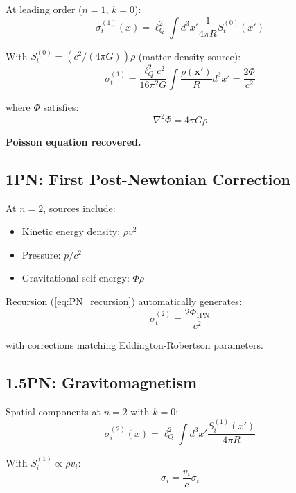 \documentclass[11pt,a4paper]{article}
\theoremstyle{definition}
\theoremstyle{remark}
\begin{document}
		At leading order ($n=1$, $k=0$):
		\begin{equation}
			\sigma_t^{(1)}(x) = \ell_Q^2\int d^3x'\frac{1}{4\pi R}S_t^{(0)}(x')
		\end{equation}
		
		With $S_t^{(0)} = (c^2/(4\pi G))\rho$ (matter density source):
		\begin{equation}
			\sigma_t^{(1)} = \frac{\ell_Q^2 c^2}{16\pi^2 G}\int\frac{\rho(\mathbf{x}')}{R}d^3x' = \frac{2\Phi}{c^2}
		\end{equation}
		
		where $\Phi$ satisfies:
		\begin{equation}
			\boxed{\nabla^2\Phi = 4\pi G\rho}
		\end{equation}
		
		\textbf{Poisson equation recovered.} \checkmark
		
		\subsection{1PN: First Post-Newtonian Correction}
		
		At $n=2$, sources include:
		\begin{itemize}
			\item Kinetic energy density: $\rho v^2$
			\item Pressure: $p/c^2$
			\item Gravitational self-energy: $\Phi\rho$
		\end{itemize}
		
		Recursion (\ref{eq:PN_recursion}) automatically generates:
		\begin{equation}
			\sigma_t^{(2)} = \frac{2\Phi_{\text{1PN}}}{c^2}
		\end{equation}
		
		with corrections matching Eddington-Robertson parameters.
		
		\subsection{1.5PN: Gravitomagnetism}
		
		Spatial components at $n=2$ with $k=0$:
		\begin{equation}
			\sigma_i^{(2)}(x) = \ell_Q^2\int d^3x'\frac{S_i^{(1)}(x')}{4\pi R}
		\end{equation}
		
		With $S_i^{(1)} \propto \rho v_i$:
		\begin{equation}
			\boxed{\sigma_i = \frac{v_i}{c}\sigma_t}
		\end{equation}
		
\end{document}
